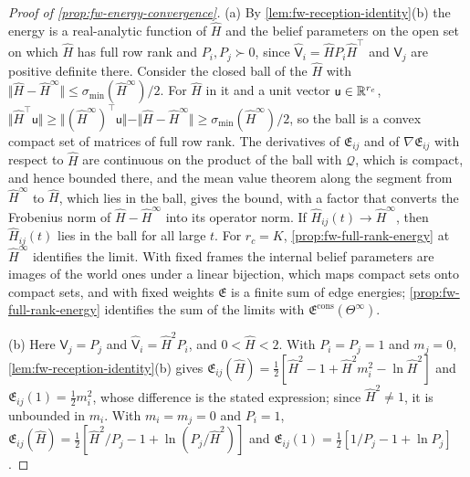 \begin{proof}[Proof of \cref{prop:fw-energy-convergence}]
(a) By \cref{lem:fw-reception-identity}(b) the energy is a real-analytic function of $\hat H$ and the belief parameters on the open set on which $\hat H$ has full row rank and $P_i,P_j\succ0$, since $\hat{\mathsf V}_i=\hat HP_i\hat H^\top$ and $\mathsf V_j$ are positive definite there. Consider the closed ball of the $\hat H$ with $\Vert\hat H-\hat H^\infty\Vert\le\sigma_{\min}(\hat H^\infty)/2$. For $\hat H$ in it and a unit vector $\mathsf u\in\mathbb{R}^{r_c}$, $\Vert\hat H^\top\mathsf u\Vert\ge\Vert(\hat H^\infty)^\top\mathsf u\Vert-\Vert\hat H-\hat H^\infty\Vert\ge\sigma_{\min}(\hat H^\infty)/2$, so the ball is a convex compact set of matrices of full row rank. The derivatives of $\mathfrak E_{ij}$ and of $\nabla\mathfrak E_{ij}$ with respect to $\hat H$ are continuous on the product of the ball with $\mathcal Q$, which is compact, and hence bounded there, and the mean value theorem along the segment from $\hat H^\infty$ to $\hat H$, which lies in the ball, gives the bound, with a factor that converts the Frobenius norm of $\hat H-\hat H^\infty$ into its operator norm. If $\hat H_{ij}(t)\to\hat H^\infty$, then $\hat H_{ij}(t)$ lies in the ball for all large $t$. For $r_c=K$, \cref{prop:fw-full-rank-energy} at $\hat H^\infty$ identifies the limit. With fixed frames the internal belief parameters are images of the world ones under a linear bijection, which maps compact sets onto compact sets, and with fixed weights $\mathfrak E$ is a finite sum of edge energies; \cref{prop:fw-full-rank-energy} identifies the sum of the limits with $\mathfrak E^{\mathrm{cons}}(\Theta^\infty)$.

(b) Here $\mathsf V_j=P_j$ and $\hat{\mathsf V}_i=\hat H^2P_i$, and $0<\hat H<2$. With $P_i=P_j=1$ and $m_j=0$, \cref{lem:fw-reception-identity}(b) gives $\mathfrak E_{ij}(\hat H)=\tfrac12[\hat H^2-1+\hat H^2m_i^2-\ln\hat H^2]$ and $\mathfrak E_{ij}(1)=\tfrac12m_i^2$, whose difference is the stated expression; since $\hat H^2\ne1$, it is unbounded in $m_i$. With $m_i=m_j=0$ and $P_i=1$, $\mathfrak E_{ij}(\hat H)=\tfrac12[\hat H^2/P_j-1+\ln(P_j/\hat H^2)]$ and $\mathfrak E_{ij}(1)=\tfrac12[1/P_j-1+\ln P_j]$.


\end{proof}
